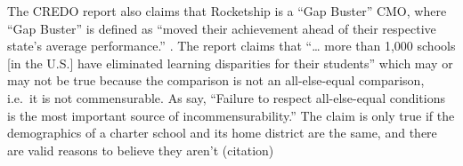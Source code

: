 The CREDO report also claims that Rocketship is a ``Gap Buster'' CMO, where ``Gap Buster'' is defined as ``moved their achievement ahead of their respective state’s average performance.'' \parencite[14]{Raymond.etal2023}. The report claims that ``\ldots{} more than 1,000 schools [in the U.S.] have eliminated learning disparities for their students'' \parencite[14]{Raymond.etal2023} which may or may not be true because the comparison is not an all-else-equal comparison, i.e.\ it is not commensurable. As \textcite[16]{Ashworth.etal2021} say, ``Failure to respect all-else-equal conditions is the most important source of incommensurability.'' The claim is only true if the demographics of a charter school and its home district are the same, and there are valid reasons to believe they aren't (citation)

